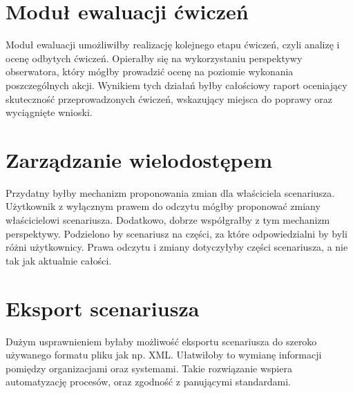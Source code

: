 \section{Moduł ewaluacji ćwiczeń}

Moduł ewaluacji umożliwiłby realizację kolejnego etapu ćwiczeń, czyli analizę i ocenę odbytych ćwiczeń. Opierałby się na 
wykorzystaniu perspektywy obserwatora, który mógłby prowadzić ocenę na poziomie wykonania poszczególnych akcji. 
Wynikiem tych działań byłby całościowy raport oceniający skuteczność przeprowadzonych ćwiczeń,
wskazujący miejsca do poprawy oraz wyciągnięte wnioski.


\section{Zarządzanie wielodostępem}

Przydatny byłby mechanizm proponowania zmian dla właściciela scenariusza. Użytkownik z wyłącznym prawem do odczytu mógłby proponować 
zmiany właścicielowi scenariusza. Dodatkowo, dobrze współgrałby z tym mechanizm perspektywy. Podzielono by scenariusz na części, 
za które odpowiedzialni by byli różni użytkownicy. Prawa odczytu i zmiany dotyczyłyby części scenariusza, a nie tak jak aktualnie 
całości.

\section{Eksport scenariusza}

Dużym usprawnieniem byłaby możliwość eksportu scenariusza do szeroko używanego formatu pliku jak np. XML.
Ułatwiłoby to wymianę informacji pomiędzy organizacjami oraz systemami. Takie rozwiązanie wspiera automatyzację procesów,
oraz zgodność z panującymi standardami.
